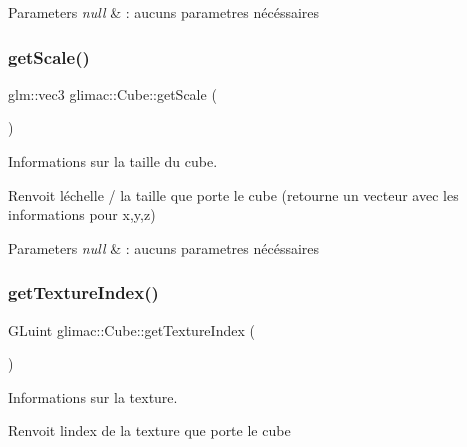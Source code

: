 \begin{DoxyParams}{Parameters}
{\em null} & \+: aucuns parametres nécéssaires \\
\hline
\end{DoxyParams}
\mbox{\label{classglimac_1_1Cube_a354f33cc28a98c481620f7f349fef1f1}} 
\subsubsection{\texorpdfstring{get\+Scale()}{getScale()}}
{\footnotesize\ttfamily glm\+::vec3 glimac\+::\+Cube\+::get\+Scale (\begin{DoxyParamCaption}{ }\end{DoxyParamCaption})\hspace{0.3cm}{\ttfamily [inline]}}



Informations sur la taille du cube. 

Renvoit l\textquotesingle{}échelle / la taille que porte le cube (retourne un vecteur avec les informations pour x,y,z)


\begin{DoxyParams}{Parameters}
{\em null} & \+: aucuns parametres nécéssaires \\
\hline
\end{DoxyParams}
\mbox{\label{classglimac_1_1Cube_afba78172419c5bf02bf04420e2fa8b09}} 
\subsubsection{\texorpdfstring{get\+Texture\+Index()}{getTextureIndex()}}
{\footnotesize\ttfamily G\+Luint glimac\+::\+Cube\+::get\+Texture\+Index (\begin{DoxyParamCaption}{ }\end{DoxyParamCaption})\hspace{0.3cm}{\ttfamily [inline]}}



Informations sur la texture. 

Renvoit l\textquotesingle{}index de la texture que porte le cube



